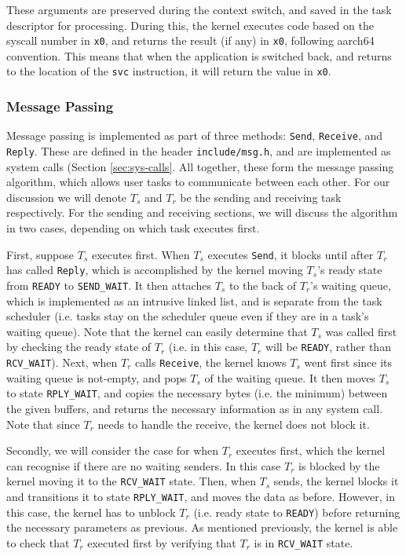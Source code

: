 \documentclass[12pt, titlepage]{article}
\begin{document}
    These arguments are preserved during the context switch, and saved in the task descriptor for processing. During this, the kernel executes code based on the syscall number in \verb`x0`, and returns the result (if any) in \verb`x0`, following aarch64 convention. This means that when the application is switched back, and returns to the location of the \verb`svc` instruction, it will return the value in \verb`x0`.

    \subsubsection{Message Passing}
    \label{sec:msg-passing}

    Message passing is implemented as part of three methods: \verb`Send`, \verb`Receive`, and \verb`Reply`. These are defined in the header \verb`include/msg.h`, and are implemented as system calls (Section \ref{sec:sys-calls}. All together, these form the message passing algorithm, which allows user tasks to communicate between each other. For our discussion we will denote $T_s$ and $T_r$ be the sending and receiving task respectively. For the sending and receiving sections, we will discuss the algorithm in two cases, depending on which task executes first.

    First, suppose $T_s$ executes first. When $T_s$ executes \verb`Send`, it blocks until after $T_r$ has called \verb`Reply`, which is accomplished by the kernel moving $T_s$'s ready state from \verb`READY` to \verb`SEND_WAIT`. It then attaches $T_s$ to the back of $T_r$'s waiting queue, which is implemented as an intrusive linked list, and is separate from the task scheduler (i.e. tasks stay on the scheduler queue even if they are in a task's waiting queue). Note that the kernel can easily determine that $T_s$ was called first by checking the ready state of $T_r$ (i.e. in this case, $T_r$ will be \verb`READY`, rather than \verb`RCV_WAIT`). Next, when $T_r$ calls \verb`Receive`, the kernel knows $T_s$ went first since its waiting queue is not-empty, and pops $T_s$ of the waiting queue. It then moves $T_s$ to state \verb`RPLY_WAIT`, and copies the necessary bytes (i.e. the minimum) between the given buffers, and returns the necessary information as in any system call. Note that since $T_r$ needs to handle the receive, the kernel does not block it.

    Secondly, we will consider the case for when $T_r$ executes first, which the kernel can recognise if there are no waiting senders. In this case $T_r$ is blocked by the kernel moving it to the \verb`RCV_WAIT` state. Then, when $T_s$ sends, the kernel blocks it and transitions it to state \verb`RPLY_WAIT`, and moves the data as before. However, in this case, the kernel has to unblock $T_r$ (i.e. ready state to \verb`READY`) before returning the necessary parameters as previous. As mentioned previously, the kernel is able to check that $T_r$ executed first by verifying that $T_r$ is in \verb`RCV_WAIT` state.
\end{document}
